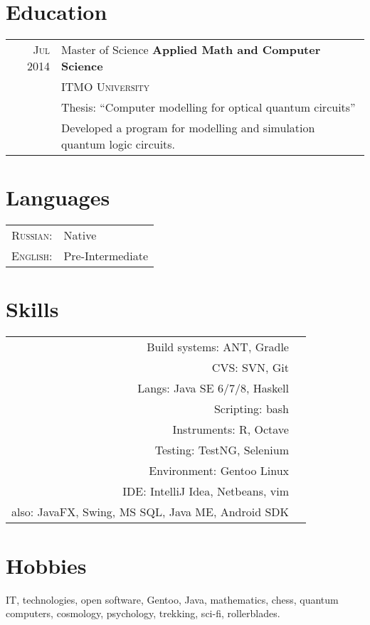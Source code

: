 \documentclass[a4paper,10pt]{article}
\begin{document}
\section{Education}
	\begin{tabular}{rl}	
	  \textsc{Jul 2014} & Master of Science \textbf{ Applied Math and Computer Science} \\& \textsc{ITMO University}\\
			& Thesis: ``Computer modelling for optical quantum circuits''\\&
			Developed a program for modelling and simulation quantum logic circuits.
	\end{tabular}

\section{Languages}
	\begin{tabular}{rl}
		\textsc{Russian:}&Native\\
		\textsc{English:}&Pre-Intermediate\\
	\end{tabular}

\section{Skills}
	\begin{tabular}{rl}
		Build systems: ANT, Gradle \\
		CVS: SVN, Git \\
		Langs: Java SE 6/7/8, Haskell \\
		Scripting: bash \\ 
		Instruments: R, Octave \\
		Testing: TestNG, Selenium \\
		Environment: Gentoo Linux \\
		IDE: IntelliJ Idea, Netbeans, vim \\
		also: JavaFX, Swing, MS SQL, Java ME, Android SDK
	\end{tabular}

\section{Hobbies}
	IT, technologies, open software, Gentoo, Java, mathematics, chess, quantum computers, cosmology,
	psychology, trekking, sci-fi, rollerblades. 
\end{document}
